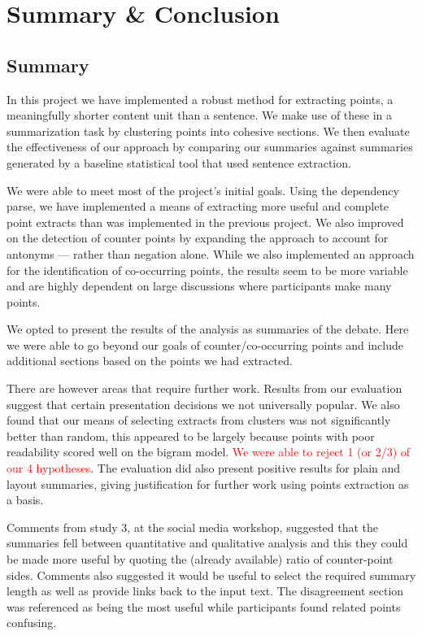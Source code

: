 \chapter{Summary \& Conclusion \label{chap:conclusion}}
  \section{Summary}
    In this project we have implemented a robust method for extracting points, a meaningfully shorter content unit than a sentence. We make use of these in a summarization task by clustering points into cohesive sections. We then evaluate the effectiveness of our approach by comparing our summaries against summaries generated by a baseline statistical tool that used sentence extraction.

    We were able to meet most of the project's initial goals. Using the dependency parse, we have implemented a means of extracting more useful and complete point extracts than was implemented in the previous project. We also improved on the detection of counter points by expanding the approach to account for antonyms --- rather than negation alone. While we also implemented an approach for the identification of co-occurring points, the results seem to be more variable and are highly dependent on large discussions where participants make many points.

    We opted to present the results of the analysis as summaries of the debate. Here we were able to go beyond our goals of counter/co-occurring points and include additional sections based on the points we had extracted.

    There are however areas that require further work. Results from our evaluation suggest that certain presentation decisions we not universally popular. We also found that our means of selecting extracts from clusters was not significantly better than random, this appeared to be largely because points with poor readability scored well on the bigram model. \textcolor{red}{We were able to reject 1 (or 2/3) of our 4 hypotheses}. The evaluation did also present positive results for plain and layout summaries, giving justification for further work using points extraction as a basis.

    Comments from study 3, at the social media workshop, suggested that the summaries fell between quantitative and qualitative analysis and this they could be made more useful by quoting the (already available) ratio of counter-point sides. Comments also suggested it would be useful to select the required summary length as well as provide links back to the input text. The disagreement section was referenced as being the most useful while participants found related points confusing.

